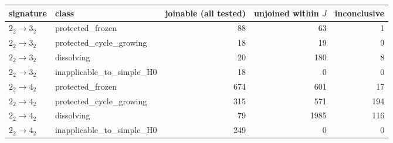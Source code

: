 \begin{tabular}{llrrr}
\toprule
signature & class & joinable (all tested) & unjoined within $J$ & inconclusive\\
\midrule
$2_2\to 3_2$ & protected\_frozen & 88 & 63 & 1\\
$2_2\to 3_2$ & protected\_cycle\_growing & 18 & 19 & 9\\
$2_2\to 3_2$ & dissolving & 20 & 180 & 8\\
$2_2\to 3_2$ & inapplicable\_to\_simple\_H0 & 18 & 0 & 0\\
$2_2\to 4_2$ & protected\_frozen & 674 & 601 & 17\\
$2_2\to 4_2$ & protected\_cycle\_growing & 315 & 571 & 194\\
$2_2\to 4_2$ & dissolving & 79 & 1985 & 116\\
$2_2\to 4_2$ & inapplicable\_to\_simple\_H0 & 249 & 0 & 0\\
\bottomrule
\end{tabular}
